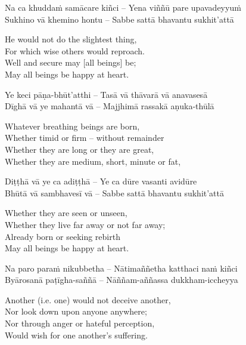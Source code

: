 Na ca khuddaṁ samācare kiñci – Yena viññū pare upavadeyyuṁ\\
Sukhino vā khemino hontu – Sabbe sattā bhavantu sukhit'attā

\begin{english-verses}
  He would not do the slightest thing,\\
  For which wise others would reproach.\\
  Well and secure may [all beings] be;\\
  May all beings be happy at heart.
\end{english-verses}

Ye keci pāṇa-bhūt'atthi – Tasā vā thāvarā vā anavasesā\\
Dīghā vā ye mahantā vā – Majjhimā rassakā aṇuka-thūlā

\begin{english-verses}
  Whatever breathing beings are born,\\
  Whether timid or firm – without remainder\\
  Whether they are long or they are great,\\
  Whether they are medium, short, minute or fat,
\end{english-verses}

Diṭṭhā vā ye ca adiṭṭhā – Ye ca dūre vasanti avidūre\\
Bhūtā vā sambhavesī vā – Sabbe sattā bhavantu sukhit'attā

\begin{english-verses}
  Whether they are seen or unseen,\\
  Whether they live far away or not far away;\\
  Already born or seeking rebirth\\
  May all beings be happy at heart.
\end{english-verses}

Na paro paraṁ nikubbetha – Nātimaññetha katthaci naṁ kiñci\\
Byārosanā paṭīgha-saññā – Nāññam-aññassa dukkham-iccheyya

\begin{english-verses}
  Another (i.e. one) would not deceive another,\\
  Nor look down upon anyone anywhere;\\
  Nor through anger or hateful perception,\\
  Would wish for one another's suffering.
\end{english-verses}

